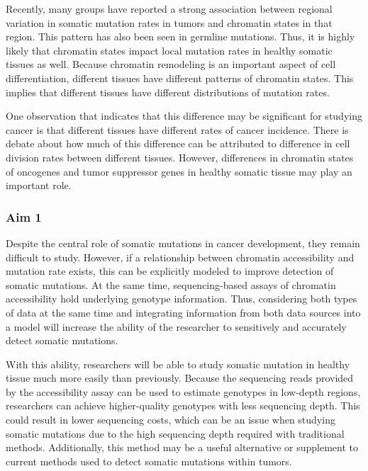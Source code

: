 Recently, many groups have reported a strong association between regional variation in somatic mutation rates in tumors and chromatin states in that region.
This pattern has also been seen in germline mutations.
Thus, it is highly likely that chromatin states impact local mutation rates in healthy somatic tissues as well.
Because chromatin remodeling is an important aspect of cell differentiation, different tissues have different patterns of chromatin states.
This implies that different tissues have different distributions of mutation rates.

One observation that indicates that this difference may be significant for studying cancer is that different tissues have different rates of cancer incidence.
There is debate about how much of this difference can be attributed to difference in cell division rates between different tissues.
However, differences in chromatin states of oncogenes and tumor suppressor genes in healthy somatic tissue may play an important role.

\subsubsection{Aim 1}

Despite the central role of somatic mutations in cancer development, they remain difficult to study.
However, if a relationship between chromatin accessibility and mutation rate exists, this can be explicitly modeled to improve detection of somatic mutations.
At the same time, sequencing-based assays of chromatin accessibility hold underlying genotype information.
Thus, considering both types of data at the same time and integrating information from both data sources into a model will increase the ability of the researcher to sensitively and accurately detect somatic mutations.

With this ability, researchers will be able to study somatic mutation in healthy tissue much more easily than previously.
Because the sequencing reads provided by the accessibility assay can be used to estimate genotypes in low-depth regions, researchers can achieve higher-quality genotypes with less sequencing depth.
This could result in lower sequencing costs, which can be an issue when studying somatic mutations due to the high sequencing depth required with traditional methods.
Additionally, this method may be a useful alternative or supplement to current methods used to detect somatic mutations within tumors.

